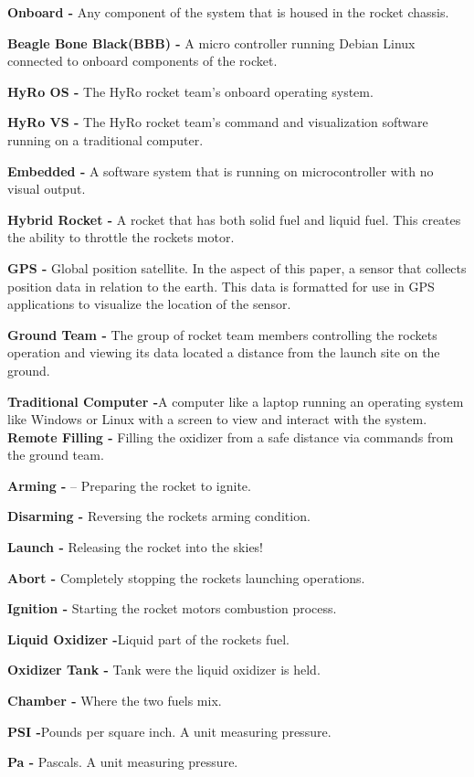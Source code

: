 \documentclass[10pt,draftclsnofoot,onecolumn,compsoc]{IEEEtran}
\begin{document}
{\bf Onboard -} Any component of the system that is housed in the rocket chassis. \par
{\bf Beagle Bone Black(BBB) -}   A micro controller running Debian Linux connected to onboard components of the rocket.\par
{\bf HyRo OS -}  The HyRo rocket team’s onboard operating system.\par
{\bf HyRo VS -} The HyRo rocket team’s command and visualization software running on a traditional computer. \par
{\bf Embedded -} A software system that is running on microcontroller with no visual output. \par
{\bf Hybrid Rocket -} A rocket that has both solid fuel and liquid fuel. This creates the ability to throttle the rockets motor. \par
{\bf GPS -} Global position satellite. In the aspect of this paper, a sensor that collects position data in relation to the earth. This data is formatted for use in GPS applications to visualize the location of the sensor.\par
{\bf Ground Team -} The group of rocket team members controlling the rockets operation and viewing its data located a distance from the launch site on the ground.\par
{\bf Traditional Computer -}A computer like a laptop running an operating system like Windows or Linux with a screen to view and interact with the system.
{\bf Remote Filling -} Filling the oxidizer from a safe distance via commands from the ground team.\par
{\bf Arming -} – Preparing the rocket to ignite.\par
{\bf Disarming -} Reversing the rockets arming condition. \par
{\bf Launch -} Releasing the rocket into the skies! \par
{\bf Abort -} Completely stopping the rockets launching operations.\par
{\bf Ignition -} Starting the rocket motors combustion process. \par
{\bf Liquid Oxidizer -}Liquid part of the rockets fuel. \par
{\bf Oxidizer Tank -} Tank were the liquid oxidizer is held. \par
{\bf Chamber -} Where the two fuels mix.\par
{\bf PSI -}Pounds per square inch. A unit measuring pressure. \par
{\bf Pa -} Pascals. A unit measuring pressure.\par
\end{document}
